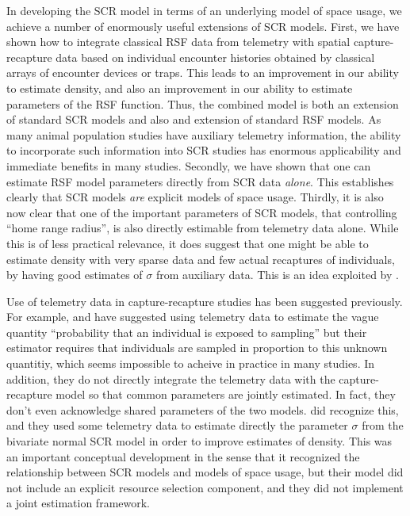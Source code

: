 In developing the SCR model in terms of an underlying model of space
usage, we achieve a number of enormously useful extensions of SCR
models. First, we have
 shown how to integrate classical RSF data from telemetry
with spatial capture-recapture data based on individual encounter
histories obtained by classical arrays of encounter devices or
traps. This leads to an improvement in our ability to estimate
density, and also an improvement in our ability to estimate parameters
of the RSF function.  Thus, the combined model is both an extension of
standard SCR models and also and extension of standard RSF models. As
many animal population studies have auxiliary telemetry information,
the ability to incorporate such information into SCR studies has
enormous applicability and immediate benefits in many studies.
Secondly, we have shown that one can estimate RSF model parameters
directly from SCR data {\it alone}. This establishes clearly that SCR
models {\it are} explicit models of space usage. Thirdly, it is also
now clear that one of the important parameters of SCR models, that
controlling ``home range radius'', is also directly estimable from
telemetry data alone. While this is of less practical relevance, it
does suggest that one might be able to estimate density with very
sparse data and few actual
recaptures of individuals, by having good estimates of $\sigma$ from
auxiliary data. This is an idea exploited by \citet{chandler_royle:2012}.

Use of telemetry data in capture-recapture studies has been suggested
previously. For example, \citet{white_shenk:2001} and
\citet{ivan:2012} have suggested using telemetry data to estimate the
vague quantity ``probability that an individual is exposed to sampling'' but
their estimator requires that individuals are sampled in proportion to
this unknown quantitiy, which seems impossible to acheive in
practice in many studies. In
addition, they do not directly integrate the telemetry data with the
capture-recapture model so that common parameters are jointly
estimated. In fact, they don't even acknowledge shared parameters of
the two models.  \citet{sollmann_etal:inprep} did recognize this, and
they used some telemetry data to estimate directly the parameter
$\sigma$ from the bivariate normal SCR model in order to improve
estimates of density. This was an important conceptual development in
the sense that it recognized the relationship between SCR models and
models of space usage, but their model did not include an explicit
resource selection component, and they did not implement a joint
estimation framework.

